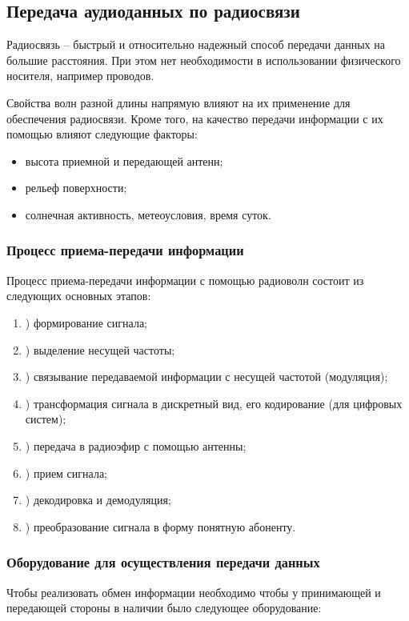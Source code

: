 \documentclass[a4paper]{report}
\begin{document}
\subsection{Передача аудиоданных по радиосвязи}

Радиосвязь – быстрый и относительно надежный способ передачи данных на большие расстояния. При этом нет необходимости в использовании физического носителя, например проводов.

Свойства волн разной длины напрямую влияют на их применение для обеспечения радиосвязи. Кроме того, на качество передачи информации с их помощью влияют следующие факторы:

\begin{itemize}
\item высота приемной и передающей антенн;
\item рельеф поверхности;
\item солнечная активность, метеоусловия, время суток.
\end{itemize}

\subsubsection{Процесс приема-передачи информации}

Процесс приема-передачи информации с помощью радиоволн состоит из следующих основных этапов:

\begin{enumerate}

\item) формирование сигнала;
\item) выделение несущей частоты;
\item) связывание передаваемой информации с несущей частотой (модуляция);
\item) трансформация сигнала в дискретный вид, его кодирование (для цифровых систем);
\item) передача в радиоэфир с помощью антенны;
\item) прием сигнала;
\item) декодировка и демодуляция;
\item) преобразование сигнала в форму понятную абоненту.
\end{enumerate}

\subsubsection{Оборудование для осуществления передачи данных}
Чтобы реализовать обмен информации необходимо чтобы у принимающей и передающей стороны в наличии было следующее оборудование:
\end{document}
